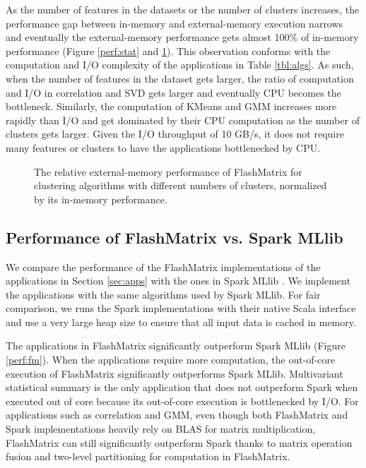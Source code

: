As the number of features in the datasets or the number of clusters increases,
the performance gap between in-memory and external-memory execution
narrows and eventually the external-memory performance gets almost 100\%
of in-memory performance (Figure \ref{perf:stat} and \ref{perf:clust}).
This observation conforms with the computation and I/O complexity of
the applications in Table \ref{tbl:algs}. As such, when the number of features
in the dataset gets larger, the ratio of computation
and I/O in correlation and SVD gets larger and eventually CPU becomes
the bottleneck. Similarly, the computation of KMeans and GMM increases
more rapidly than I/O and get dominated by their CPU computation as the number
of clusters gets larger. Given the I/O throughput of 10 GB/s, it does not
require many features or clusters to have the applications bottlenecked by
CPU.

\begin{figure}
	\begin{center}
		\footnotesize
		
		\caption{The relative external-memory performance of FlashMatrix for
			clustering algorithms with different numbers of clusters, normalized
		by its in-memory performance.}
		\label{perf:clust}
	\end{center}
\end{figure}

\subsection{Performance of FlashMatrix vs. Spark MLlib}

We compare the performance of the FlashMatrix implementations of the applications
in Section \ref{sec:apps} with the ones in Spark MLlib \cite{mllib}. We implement
the applications with
the same algorithms used by Spark MLlib. For fair comparison, we runs the Spark
implementations with their native Scala interface and use a very large heap size
to ensure that all input data is cached in memory.

The applications in FlashMatrix significantly outperform Spark MLlib (Figure
\ref{perf:fm}). When the applications require more computation, the out-of-core
execution of FlashMatrix significantly outperforms Spark MLlib. Multivariant
statistical summary is the only application that does not outperform Spark
when executed out of core because its out-of-core execution is bottlenecked
by I/O. For applications such as correlation and GMM, even though both FlashMatrix
and Spark implementations heavily rely on BLAS for matrix multiplication,
FlashMatrix can still significantly outperform Spark thanks to matrix operation
fusion and two-level partitioning for computation in FlashMatrix.

